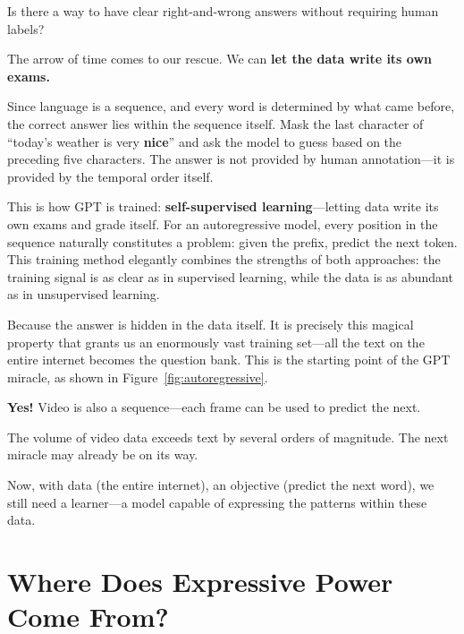 Is there a way to have clear right-and-wrong answers without requiring human labels?

The arrow of time comes to our rescue. We can \textbf{let the data write its own exams.}

\vspace{1em}

Since language is a sequence, and every word is determined by what came before,
the correct answer lies within the sequence itself.
Mask the last character of ``today's weather is very \textbf{nice}'' and ask the model to guess based on the preceding five characters.
The answer is not provided by human annotation---it is provided by the temporal order itself.

\vspace{1em}

This is how GPT is trained: \textbf{self-supervised learning}---letting data write its own exams and grade itself.
For an autoregressive model, every position in the sequence naturally constitutes a problem: given the prefix, predict the next token.
This training method elegantly combines the strengths of both approaches: the training signal is as clear as in supervised learning, while the data is as abundant as in unsupervised learning.

\vspace{1em}

Because the answer is hidden in the data itself.
It is precisely this magical property that grants us an enormously vast training set---all the text on the entire internet becomes the question bank. This is the starting point of the GPT miracle, as shown in Figure~\ref{fig:autoregressive}.



\begin{thinkbox}

\textbf{Yes!} Video is also a sequence---each frame can be used to predict the next.

The volume of video data exceeds text by several orders of magnitude. The next miracle may already be on its way.

\end{thinkbox}

Now, with data (the entire internet), an objective (predict the next word), we still need a learner---a model capable of expressing the patterns within these data.

\newpage
\section{Where Does Expressive Power Come From?}

